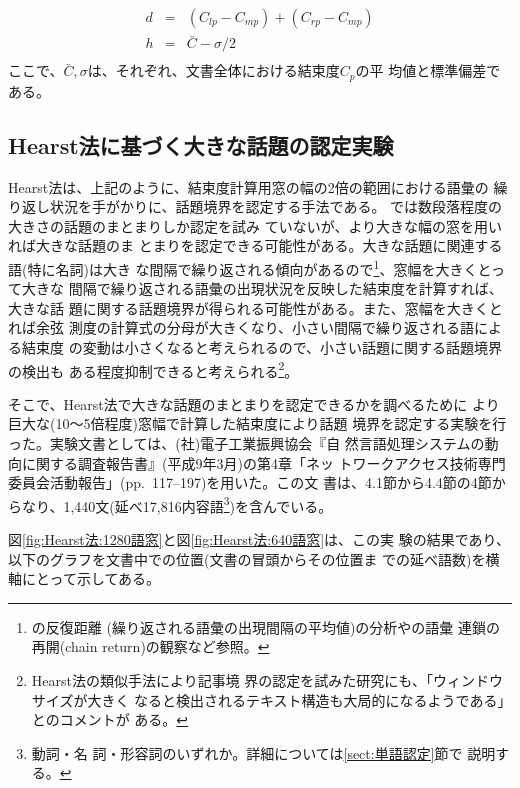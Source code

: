 \begin{eqnarray*}
  d &=& (C_{lp} - C_{mp}) + (C_{rp} - C_{mp}) \\ 
  h &=&  \bar{C} - \sigma/2 \\
\end{eqnarray*}
\noindent{}
ここで、$\bar{C}, \sigma$は、それぞれ、文書全体における結束度$C_p$の平
均値と標準偏差である。

\subsection{Hearst法に基づく大きな話題の認定実験}
\label{sect:大きな話題の認定実験}


Hearst法は、上記のように、結束度計算用窓の幅の2倍の範囲における語彙の
繰り返し状況を手がかりに、話題境界を認定する手法である。
\cite{PACL-32-P9}では数段落程度の大きさの話題のまとまりしか認定を試み
ていないが、\cite{PACL-32-P9}より大きな幅の窓を用いれば大きな話題のま
とまりを認定できる可能性がある。大きな話題に関連する語(特に名詞)は大き
な間隔で繰り返される傾向があるので\footnote{\cite{BABA.T-86}の反復距離
  (繰り返される語彙の出現間隔の平均値)の分析や\cite{CL-V17N1P21}の語彙
  連鎖の再開(chain return)の観察など参照。}、窓幅を大きくとって大きな
間隔で繰り返される語彙の出現状況を反映した結束度を計算すれば、大きな話
題に関する話題境界が得られる可能性がある。また、窓幅を大きくとれば余弦
測度の計算式の分母が大きくなり、小さい間隔で繰り返される語による結束度
の変動は小さくなると考えられるので、小さい話題に関する話題境界の検出も
ある程度抑制できると考えられる\footnote{Hearst法の類似手法により記事境
  界の認定を試みた研究\cite{NLC93-63}にも、「ウィンドウサイズが大きく
  なると検出されるテキスト構造も大局的になるようである」とのコメントが
  ある。}。

そこで、Hearst法で大きな話題のまとまりを認定できるかを調べるために
\cite{PACL-32-P9}より巨大な(10〜5倍程度)窓幅で計算した結束度により話題
境界を認定する実験を行った。実験文書としては、(社)電子工業振興協会『自
然言語処理システムの動向に関する調査報告書』(平成9年3月)の第4章「ネッ
トワークアクセス技術専門委員会活動報告」(pp.~117--197)を用いた。この文
書は、4.1節から4.4節の4節からなり、1,440文(延べ17,816内容語\footnote{
  動詞・名 詞・形容詞のいずれか。詳細については\ref{sect:単語認定}節で
  説明する。})を含んでいる。


図\ref{fig:Hearst法:1280語窓}と図\ref{fig:Hearst法:640語窓}は、この実
験の結果であり、以下のグラフを文書中での位置(文書の冒頭からその位置ま
での延べ語数)を横軸にとって示してある。

